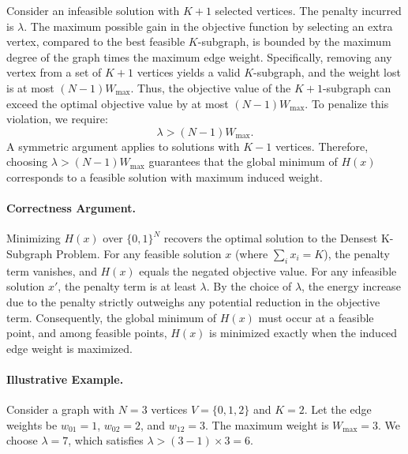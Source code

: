 \documentclass[12pt]{article}
\begin{document}
Consider an infeasible solution with $K+1$ selected vertices. The penalty incurred is $\lambda$. The maximum possible gain in the objective function by selecting an extra vertex, compared to the best feasible $K$-subgraph, is bounded by the maximum degree of the graph times the maximum edge weight. Specifically, removing any vertex from a set of $K+1$ vertices yields a valid $K$-subgraph, and the weight lost is at most $(N-1)W_{\max}$. Thus, the objective value of the $K+1$-subgraph can exceed the optimal objective value by at most $(N-1)W_{\max}$. To penalize this violation, we require:
\begin{equation}
    \lambda > (N - 1) W_{\max}.
\end{equation}
A symmetric argument applies to solutions with $K-1$ vertices. Therefore, choosing $\lambda > (N-1)W_{\max}$ guarantees that the global minimum of $H(x)$ corresponds to a feasible solution with maximum induced weight.

\paragraph{Correctness Argument.}
Minimizing $H(x)$ over $\{0,1\}^N$ recovers the optimal solution to the Densest K-Subgraph Problem. For any feasible solution $x$ (where $\sum_i x_i = K$), the penalty term vanishes, and $H(x)$ equals the negated objective value. For any infeasible solution $x'$, the penalty term is at least $\lambda$. By the choice of $\lambda$, the energy increase due to the penalty strictly outweighs any potential reduction in the objective term. Consequently, the global minimum of $H(x)$ must occur at a feasible point, and among feasible points, $H(x)$ is minimized exactly when the induced edge weight is maximized.

\paragraph{Illustrative Example.}
Consider a graph with $N=3$ vertices $V=\{0,1,2\}$ and $K=2$. Let the edge weights be $w_{01}=1$, $w_{02}=2$, and $w_{12}=3$. The maximum weight is $W_{\max}=3$. We choose $\lambda = 7$, which satisfies $\lambda > (3-1) \times 3 = 6$.
\end{document}
